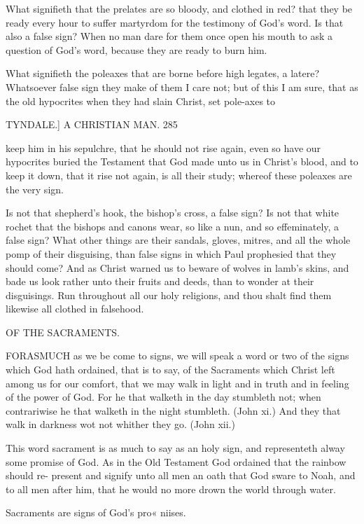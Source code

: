 \documentclass{custom}
\begin{document}
{{What signifieth that the prelates are so bloody, and 
clothed in red? that they be ready every hour to suffer 
martyrdom for the testimony of God's word. Is that also 
a false sign? When no man dare for them once open 
his mouth to ask a question of God's word, because they 
are ready to burn him. 

What signifieth the poleaxes that are borne before 
high legates, a latere? Whatsoever false sign they make of 
them I care not; but of this I am sure, that as the old 
hypocrites when they had slain Christ, set pole-axes to 


TYNDALE.]
A CHRISTIAN MAN.
285

keep him in his sepulchre, that he should not rise again, 
even so have our hypocrites buried the Testament that 
God made unto us in Christ's blood, and to keep it 
down, that it rise not again, is all their study; whereof 
these poleaxes are the very sign. 

Is not that shepherd's hook, the bishop's cross, a false 
sign? Is not that white rochet that the bishops and 
canons wear, so like a nun, and so effeminately, a false 
sign? What other things are their sandals, gloves, mitres, 
and all the whole pomp of their disguising, than false signs 
in which Paul prophesied that they should come? And 
as Christ warned us to beware of wolves in lamb's skins,
and bade us look rather unto their fruits and deeds, than
to wonder at their disguisings. Run throughout all our
holy religions, and thou shalt find them likewise all 
clothed in falsehood. 


OF THE SACRAMENTS. 

FORASMUCH as we be come to signs, we will speak 
a word or two of the signs which God hath ordained, 
that is to say, of the Sacraments which Christ left among 
us for our comfort, that we may walk in light and in truth 
and in feeling of the power of God. For he that walketh 
in the day stumbleth not; when contrariwise he that 
walketh in the night stumbleth. (John xi.) And they that 
walk in darkness wot not whither they go. (John xii.) 

This word sacrament is as much to say as an holy sign, 
and representeth alway some promise of God. As in the 
Old Testament God ordained that the rainbow should re- 
present and signify unto all men an oath that God sware 
to Noah, and to all men after him, that he would no more 
drown the world through water. 

Sacraments 
are signs of 
God's pro« 
niises. 


}}
\end{document}
